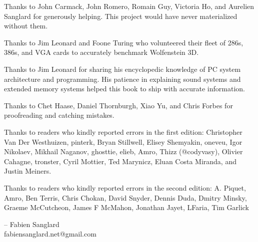 Thanks to John Carmack, John Romero, Romain Guy, Victoria Ho, and Aurelien Sanglard for generously helping. This project would have never
materialized without them.\\ 
\par
Thanks to  Jim Leonard and Foone Turing who volunteered their fleet of 286s, 386s, and VGA cards to accurately benchmark Wolfenstein 3D.\\
\par
Thanks to  Jim Leonard for sharing his encyclopedic knowledge of PC system architecture and programming. His patience in explaining sound systems and extended memory systems helped this book to ship with accurate information.\\
\par
Thanks to  Chet Haase, Daniel Thornburgh, Xiao Yu, and Chris Forbes for proofreading and catching mistakes.\\
\par
Thanks to readers who kindly reported errors in the first edition: Christopher Van Der Westhuizen, pinterk, Bryan Stillwell, Elisey Shemyakin, oneveu, Igor Nikolaev, Mikhail Naganov, ghosttie, elieb, Amro, Thizz (@codyvasy), Olivier Cahagne, tronster, Cyril Mottier, Ted Marynicz, 
Eluan Costa Miranda, and Justin Meiners.\\
\par
Thanks to readers who kindly reported errors in the second edition: A. Piquet, Amro, Ben Terris, Chris Chokan, David Snyder, Dennis Duda, Dmitry Minsky, Graeme McCutcheon, James F McMahon, Jonathan Jayet, LFaria, Tim Garlick\\
\par
-- Fabien Sanglard\\
fabiensanglard.net@gmail.com
\thispagestyle{plain} %
